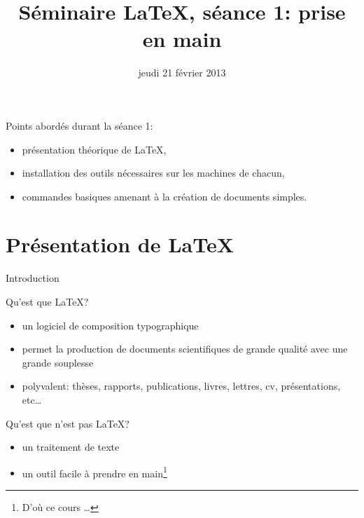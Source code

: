 \documentclass{beamer}
\title{Séminaire \LaTeX, séance 1: prise en main}
\date{jeudi 21 février 2013}
\begin{document}

\begin{frame}
    \titlepage
\end{frame}


\begin{frame}{Points abordés durant la séance 1:}
    \begin{itemize}
            \item présentation théorique de \LaTeX,
            \item installation des outils nécessaires sur les machines de chacun,
            \item commandes basiques amenant à la création de documents simples. 
        \end{itemize}
\end{frame}




\section{Présentation de \LaTeX} 


\begin{frame}{Introduction}
    \begin{block}{Qu'est que \LaTeX?}
        \begin{itemize}
            \item un logiciel de composition typographique
            \item permet la production de documents scientifiques de grande qualité avec une grande souplesse
            \item polyvalent: thèses, rapports, publications, livres, lettres, cv, présentations, etc\dots
        \end{itemize}
    \end{block}
    \begin{block}{Qu'est que n'est pas \LaTeX?}
        \begin{itemize}
            \item un traitement de texte
            \item un outil facile à prendre en main\footnote{D'où ce cours \dots}
        \end{itemize}
    \end{block}
\end{frame}
\end{document}
